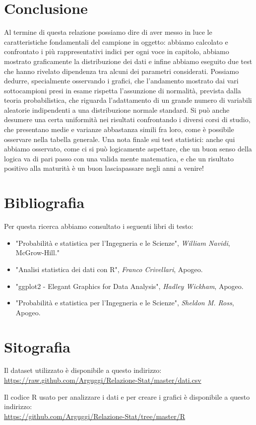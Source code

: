 \clearpage
\section{Conclusione}
Al termine di questa relazione possiamo dire di aver messo in luce le caratteristiche fondamentali del campione in oggetto: abbiamo calcolato e confrontato i più rappresentativi indici per ogni voce in capitolo, abbiamo mostrato graficamente la distribuzione dei dati e infine abbiamo eseguito due test che hanno rivelato dipendenza tra alcuni dei parametri considerati.
Possiamo dedurre, specialmente osservando i grafici, che l’andamento mostrato dai vari sottocampioni presi in esame rispetta l’assunzione di normalità, prevista dalla teoria probabilistica, che riguarda l’adattamento di un grande numero di variabili aleatorie indipendenti a una distribuzione normale standard.  
Si può anche desumere una certa uniformità nei risultati confrontando i diversi corsi di studio, che presentano medie e varianze abbastanza simili fra loro, come è possibile osservare nella tabella generale.
Una nota finale sui test statistici: anche qui abbiamo osservato, come ci si può logicamente aspettare, che un buon senso della logica va di pari passo con una valida mente matematica, e che un risultato positivo alla maturità è un buon lasciapassare negli anni a venire!

\section{Bibliografia}
Per questa ricerca abbiamo consultato i seguenti libri di testo:
\begin{itemize}
  \item "Probabilità e statistica per l’Ingegneria e le Scienze", \textit{William Navidi}, McGrow-Hill."
  \item "Analisi statistica dei dati con R", \textit{Franco Crivellari}, Apogeo.
  \item "ggplot2 - Elegant Graphics for Data Analysis", \textit{Hadley Wickham}, Apogeo.
  \item "Probabilità e statistica per l’Ingegneria e le Scienze", \textit{Sheldon M. Ross}, Apogeo.
\end{itemize}

\section{Sitografia}

Il dataset utilizzato è disponibile a questo indirizzo: \\
\url{https://raw.github.com/Arguggi/Relazione-Stat/master/dati.csv}

\noindent Il codice R usato per analizzare i dati e per creare i grafici è disponibile a questo indirizzo: \\
\url{https://github.com/Arguggi/Relazione-Stat/tree/master/R}
